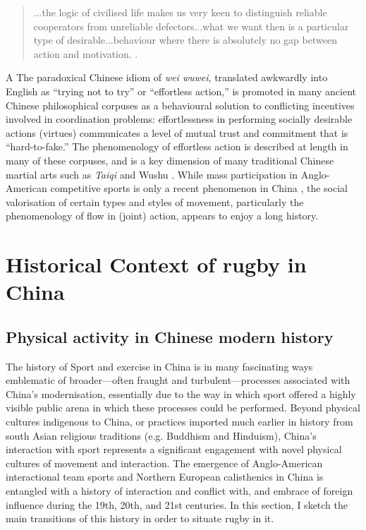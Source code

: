 \begin{CJK}{UTF8}{gbsn}
\begin{quotation}
   ...the logic of civilised life makes us very keen to distinguish reliable cooperators from unreliable defectors...what we want then is a particular type of desirable...behaviour where there is absolutely no gap between action and motivation.  \citep[192]{Slingerland2014}.
\end{quotation}

A The paradoxical Chinese idiom of \textit{wei wuwei}, translated awkwardly into English as ``trying not to try'' or ``effortless action,'' is promoted in many ancient Chinese philosophical corpuses as a behavioural solution to conflicting incentives involved in coordination problems: effortlessness in performing socially desirable actions (virtues) communicates a level of mutual trust and commitment that is ``hard-to-fake.''  The phenomenology of effortless action is described at length in many of these corpuses, and is a key dimension of many traditional Chinese martial arts such as \textit{Taiqi} and Wushu \citep{Morris1998}.  While mass participation in Anglo-American competitive sports is only a recent phenomenon in China \citep{Brownell2008}, the social valorisation of certain types and styles of movement, particularly the phenomenology of flow in (joint) action, appears to enjoy a long history.











\section{Historical Context of rugby in China}

\subsection{Physical activity in Chinese modern history}
The history of Sport and exercise in China is in many fascinating ways emblematic of broader---often fraught and turbulent---processes associated with China's modernisation, essentially due to the way in which sport offered a highly visible public arena in which these processes could be performed.  Beyond physical cultures indigenous to China, or practices imported much earlier in history from south Asian religious traditions (e.g. Buddhism and Hinduism), China's interaction with sport represents a significant engagement with novel physical cultures of movement and interaction.  The emergence of Anglo-American interactional team sports and Northern European calisthenics in China is entangled with a history of interaction and conflict with, and embrace of foreign influence during the 19th, 20th, and 21st centuries.  In this section, I sketch the main transitions of this history in order to situate rugby in it.


\end{CJK}
